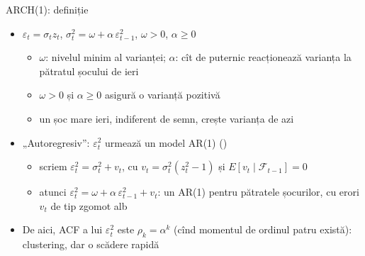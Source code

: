 \begin{frame}{ARCH(1): definiție}
\itemsize{\small}
\begin{itemize}
    \item $\varepsilon_t = \sigma_t z_t$, \quad $\sigma_t^2 = \omega + \alpha\,\varepsilon_{t-1}^2$, \quad $\omega > 0$, $\alpha \ge 0$
    \begin{itemize}
        \item $\omega$: nivelul minim al varianței; $\alpha$: cît de puternic reacționează varianța la pătratul șocului de ieri
        \item $\omega > 0$ și $\alpha \ge 0$ asigură o varianță pozitivă
        \item un șoc mare ieri, indiferent de semn, crește varianța de azi
    \end{itemize}
    \item „Autoregresiv”: $\varepsilon_t^2$ urmează un model AR(1) ()
    \begin{itemize}
        \item scriem $\varepsilon_t^2 = \sigma_t^2 + v_t$, cu $v_t = \sigma_t^2(z_t^2 - 1)$ și $E[v_t \mid \mathcal{F}_{t-1}] = 0$
        \item atunci $\varepsilon_t^2 = \omega + \alpha\,\varepsilon_{t-1}^2 + v_t$: un AR(1) pentru pătratele șocurilor, cu erori $v_t$ de tip zgomot alb
    \end{itemize}
    \item De aici, ACF a lui $\varepsilon_t^2$ este $\rho_k = \alpha^k$ (cînd momentul de ordinul patru există): clustering, dar o scădere rapidă
\end{itemize}
\end{frame}

